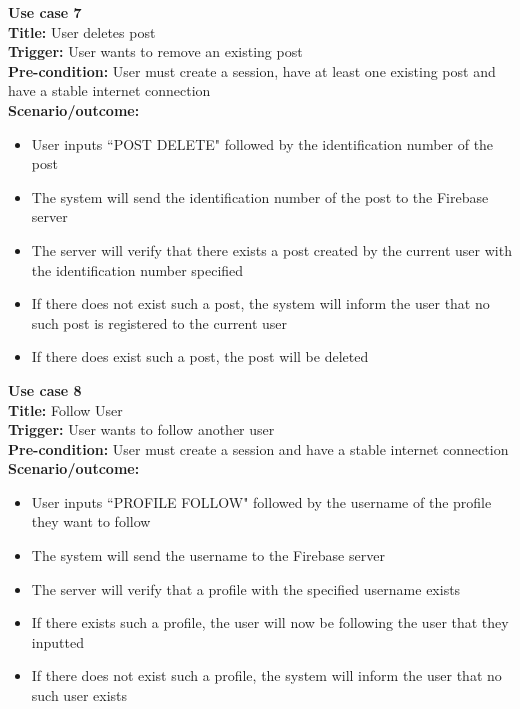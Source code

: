 \documentclass[12pt, titlepage]{article}
\begin{document}
\textbf{Use case 7}\\
\textbf{Title:} User deletes post\\
\textbf{Trigger:} User wants to remove an existing post\\
\textbf{Pre-condition:} User must create a session, have at least one existing post and have a stable internet connection\\
\textbf{Scenario/outcome:}
    \begin{itemize}
        \item User inputs ``POST DELETE" followed by the identification number of the post
        \item The system will send the identification number of the post to the Firebase server
        \item The server will verify that there exists a post created by the current user with the identification number specified
        \item If there does not exist such a post, the system will inform the user that no such post is registered to the current user
        \item If there does exist such a post, the post will be deleted
    \end{itemize}
    
    
\textbf{Use case 8}\\
\textbf{Title:} Follow User\\
\textbf{Trigger:} User wants to follow another user\\
\textbf{Pre-condition:} User must create a session and have a stable internet connection\\
\textbf{Scenario/outcome:}
    \begin{itemize}
        \item User inputs ``PROFILE FOLLOW" followed by the username of the profile they want to follow
        \item The system will send the username to the Firebase server
        \item The server will verify that a profile with the specified username exists
        \item If there exists such a profile, the user will now be following the user that they inputted
        \item If there does not exist such a profile, the system will inform the user that no such user exists
    \end{itemize}
    
\end{document}
